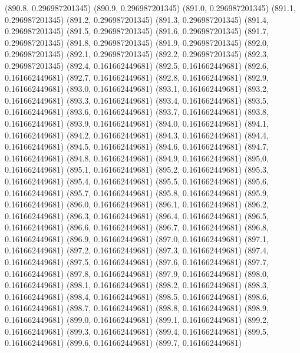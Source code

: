 {					(890.8, 0.296987201345)
					(890.9, 0.296987201345)
					(891.0, 0.296987201345)
					(891.1, 0.296987201345)
					(891.2, 0.296987201345)
					(891.3, 0.296987201345)
					(891.4, 0.296987201345)
					(891.5, 0.296987201345)
					(891.6, 0.296987201345)
					(891.7, 0.296987201345)
					(891.8, 0.296987201345)
					(891.9, 0.296987201345)
					(892.0, 0.296987201345)
					(892.1, 0.296987201345)
					(892.2, 0.296987201345)
					(892.3, 0.296987201345)
					(892.4, 0.161662449681)
					(892.5, 0.161662449681)
					(892.6, 0.161662449681)
					(892.7, 0.161662449681)
					(892.8, 0.161662449681)
					(892.9, 0.161662449681)
					(893.0, 0.161662449681)
					(893.1, 0.161662449681)
					(893.2, 0.161662449681)
					(893.3, 0.161662449681)
					(893.4, 0.161662449681)
					(893.5, 0.161662449681)
					(893.6, 0.161662449681)
					(893.7, 0.161662449681)
					(893.8, 0.161662449681)
					(893.9, 0.161662449681)
					(894.0, 0.161662449681)
					(894.1, 0.161662449681)
					(894.2, 0.161662449681)
					(894.3, 0.161662449681)
					(894.4, 0.161662449681)
					(894.5, 0.161662449681)
					(894.6, 0.161662449681)
					(894.7, 0.161662449681)
					(894.8, 0.161662449681)
					(894.9, 0.161662449681)
					(895.0, 0.161662449681)
					(895.1, 0.161662449681)
					(895.2, 0.161662449681)
					(895.3, 0.161662449681)
					(895.4, 0.161662449681)
					(895.5, 0.161662449681)
					(895.6, 0.161662449681)
					(895.7, 0.161662449681)
					(895.8, 0.161662449681)
					(895.9, 0.161662449681)
					(896.0, 0.161662449681)
					(896.1, 0.161662449681)
					(896.2, 0.161662449681)
					(896.3, 0.161662449681)
					(896.4, 0.161662449681)
					(896.5, 0.161662449681)
					(896.6, 0.161662449681)
					(896.7, 0.161662449681)
					(896.8, 0.161662449681)
					(896.9, 0.161662449681)
					(897.0, 0.161662449681)
					(897.1, 0.161662449681)
					(897.2, 0.161662449681)
					(897.3, 0.161662449681)
					(897.4, 0.161662449681)
					(897.5, 0.161662449681)
					(897.6, 0.161662449681)
					(897.7, 0.161662449681)
					(897.8, 0.161662449681)
					(897.9, 0.161662449681)
					(898.0, 0.161662449681)
					(898.1, 0.161662449681)
					(898.2, 0.161662449681)
					(898.3, 0.161662449681)
					(898.4, 0.161662449681)
					(898.5, 0.161662449681)
					(898.6, 0.161662449681)
					(898.7, 0.161662449681)
					(898.8, 0.161662449681)
					(898.9, 0.161662449681)
					(899.0, 0.161662449681)
					(899.1, 0.161662449681)
					(899.2, 0.161662449681)
					(899.3, 0.161662449681)
					(899.4, 0.161662449681)
					(899.5, 0.161662449681)
					(899.6, 0.161662449681)
					(899.7, 0.161662449681)
}
